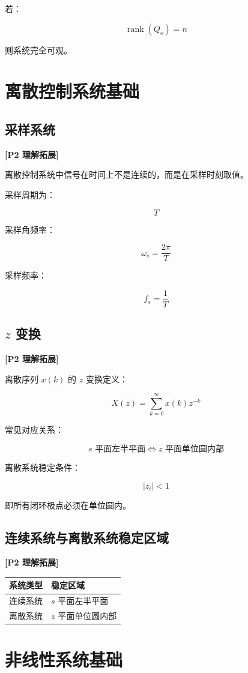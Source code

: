 \documentclass[UTF8,a4paper,12pt]{ctexart}
\newcommand{\Ptwo}{\textcolor{p2}{\textbf{[P2 理解拓展]}}}
\begin{document}
若：

\[
\operatorname{rank}(Q_o)=n
\]

则系统完全可观。

\section{离散控制系统基础}

\subsection{采样系统}

\Ptwo

离散控制系统中信号在时间上不是连续的，而是在采样时刻取值。

采样周期为：

\[
T
\]

采样角频率：

\[
\omega_s=\frac{2\pi}{T}
\]

采样频率：

\[
f_s=\frac{1}{T}
\]

\subsection{$z$ 变换}

\Ptwo

离散序列 $x(k)$ 的 $z$ 变换定义：

\[
X(z)=\sum_{k=0}^{\infty}x(k)z^{-k}
\]

常见对应关系：

\[
s \text{ 平面左半平面} \Longleftrightarrow z \text{ 平面单位圆内部}
\]

离散系统稳定条件：

\[
|z_i|<1
\]

即所有闭环极点必须在单位圆内。

\subsection{连续系统与离散系统稳定区域}

\Ptwo

\begin{longtable}{p{5cm}p{7cm}}
\toprule
系统类型 & 稳定区域 \\
\midrule
连续系统 & $s$ 平面左半平面 \\
离散系统 & $z$ 平面单位圆内部 \\
\bottomrule
\end{longtable}

\section{非线性系统基础}
\end{document}
